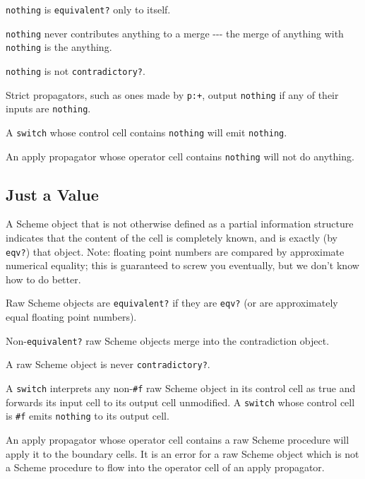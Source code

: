 \documentclass[12pt,letterpaper,english]{article}
\begin{document}
\texttt{nothing} is \texttt{equivalent?} only to itself.

\texttt{nothing} never contributes anything to a merge -{}-{}- the merge of
anything with \texttt{nothing} is the anything.

\texttt{nothing} is not \texttt{contradictory?}.

Strict propagators, such as ones made by \texttt{p:+}, output \texttt{nothing}
if any of their inputs are \texttt{nothing}.

A \texttt{switch} whose control cell contains \texttt{nothing} will emit
\texttt{nothing}.

An apply propagator whose operator cell contains \texttt{nothing} will not
do anything.



\hypertarget{just-a-value}{}
\subsection{Just a Value}
\label{just-a-value}

A Scheme object that is not otherwise defined as a partial information
structure indicates that the content of the cell is
completely known, and is exactly (by \texttt{eqv?}) that object.  Note:
floating point numbers are compared by approximate numerical equality;
this is guaranteed to screw you eventually, but we don't know how to
do better.

Raw Scheme objects are \texttt{equivalent?} if they are \texttt{eqv?} (or are
approximately equal floating point numbers).

Non-\texttt{equivalent?} raw Scheme objects merge into the contradiction object.

A raw Scheme object is never \texttt{contradictory?}.

A \texttt{switch} interprets any non-\texttt{{\#}f} raw Scheme object in its
control cell as true and forwards its input cell to its output cell
unmodified.  A \texttt{switch} whose control cell is \texttt{{\#}f} emits
\texttt{nothing} to its output cell.

An apply propagator whose operator cell contains a raw Scheme
procedure will apply it to the boundary cells.  It is an error for a
raw Scheme object which is not a Scheme procedure to flow into the
operator cell of an apply propagator.


\end{document}
